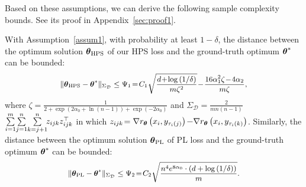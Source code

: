 Based on  these  assumptions, we can derive the following sample complexity bounds. See its proof in Appendix~\ref{sec:proof1}.
\begin{theorem}
	\label{thm:estimator}
With Assumption~\ref{assum1},   with probability at least $1-\delta$, the distance between the optimum solution $\boldsymbol{\theta}_{\text{HPS}}$ of our HPS loss and the ground-truth optimum $\boldsymbol{\theta}^{*}$ can be bounded: 
	\begin{equation*}
		\fontsize{9}{3}\selectfont{
			\begin{aligned}
				& \|\wmi{HPS} - \wms\|_{{\Sigma}_{\mathcal{D}}}\leq \Psi_1 \!=\! C_{1}\sqrt{\frac{d\!+\!\log\left(1/\delta \right)}{m\zeta^{2}}}\!-\!\frac{16\alpha_{1}^{2}\zeta\!-\!4\alpha_{2}}{m\zeta},\\
		\end{aligned}}
	\end{equation*}
	where $\zeta \!=\!\frac{1}{2+\exp\left(2\alpha_{0}+\ln(n-1)\right)+\exp\left(-2\alpha_{0}\right)}$ and  $\Sigma_{\mathcal{D}}\!=\!\frac{2}{mn(n-1)} $ $\sum\limits_{i=1}^{m}\!\sum\limits_{j=1}^{n}\!\sum\limits_{k=j+1}^{n} \!\! z_{ijk} z_{ijk}^\top$  in which $z_{ijk} \!=\! $ $ \nabla r_{{\boldsymbol{\theta}}}\left(x_{i},y_{\tau_{i}\left( j\right)}\right)$$-$$\nabla r_{{\boldsymbol{\theta}}}\left(x_{i},y_{\tau_{i}\left( k\right)}\right)$.  Similarly,  the distance between the optimum solution $\boldsymbol{\theta}_{\text{PL}}$ of PL  loss and the ground-truth optimum $\boldsymbol{\theta}^{*}$ can be bounded: 
		\begin{equation*}
		\fontsize{9}{3}\selectfont{
			\begin{aligned}
				\|\wmi{PL} - \wms\|_{{\Sigma}_{\mathcal{D}}}\leq \Psi_2 \!=\! C_2 \sqrt{\frac{ n^{4}e^{8\alpha_{0}}\cdot\left(d+\log\left(1/\delta\right)\right)}{m}}.
		\end{aligned}}
	\end{equation*}
%	
\end{theorem}
